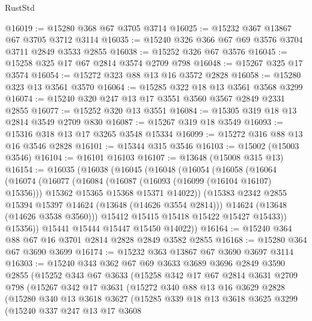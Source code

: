 \begin{lexlean}{RustStd}
\begin{coremodule}
@16019 := @15280 @368 @67 @3705 @3714
@16025 := @15232 @367 @13867 @67 @3705 @3712 @3114
@16035 := @15240 @326 @366 @67 @69 @3576 @3704 @3711 @2849 @3533 @2855
@16038 := @15252 @326 @67 @3576
@16045 := @15258 @325 @17 @67 @2814 @3574 @2709 @798
@16048 := @15267 @325 @17 @3574
@16054 := @15272 @323 @88 @13 @16 @3572 @2828
@16058 := @15280 @323 @13 @3561 @3570
@16064 := @15285 @322 @18 @13 @3561 @3568 @3299
@16074 := @15240 @320 @247 @13 @17 @3551 @3560 @3567 @2849 @2331 @2855
@16077 := @15252 @320 @13 @3551
@16084 := @15305 @319 @18 @13 @2814 @3549 @2709 @830
@16087 := @15267 @319 @18 @3549
@16093 := @15316 @318 @13 @17 @3265 @3548 @15334
@16099 := @15272 @316 @88 @13 @16 @3546 @2828
@16101 := @15344 @315 @3546
@16103 := @15002 (@15003 @3546)
@16104 := @16101 @16103
@16107 := @13648 (@15008 @315 @13)
@16154 := @16035
    (@16038
      (@16045
        (@16048
          (@16054
            (@16058
              (@16064
                (@16074
                  (@16077
                    (@16084
                      (@16087 (@16093 (@16099 (@16104 @16107) @15356)))
                      @15362
                      @15365
                      @15368
                      @15371
                      @14022))
                  (@15383 @2342 @2855 @15394 @15397 @14624 (@13648 (@14626 @3554 @2814)))
                  @14624
                  (@13648 (@14626 @3538 @3560)))
                @15412
                @15415
                @15418
                @15422
                @15427
                @15433))
            @15356))
        @15441
        @15444
        @15447
        @15450
        @14022))
@16164 := @15240 @364 @88 @67 @16 @3701 @2814 @2828 @2849 @3582 @2855
@16168 := @15280 @364 @67 @3690 @3699
@16174 := @15232 @363 @13867 @67 @3690 @3697 @3114
@16303 := @15240
    @343
    @362
    @67
    @69
    @3633
    @3689
    @3696
    @2849
    @3590
    @2855
    (@15252
      @343
      @67
      @3633
      (@15258
        @342
        @17
        @67
        @2814
        @3631
        @2709
        @798
        (@15267
          @342
          @17
          @3631
          (@15272
            @340
            @88
            @13
            @16
            @3629
            @2828
            (@15280
              @340
              @13
              @3618
              @3627
              (@15285
                @339
                @18
                @13
                @3618
                @3625
                @3299
                (@15240
                  @337
                  @247
                  @13
                  @17
                  @3608

\end{coremodule}
\end{lexlean}
